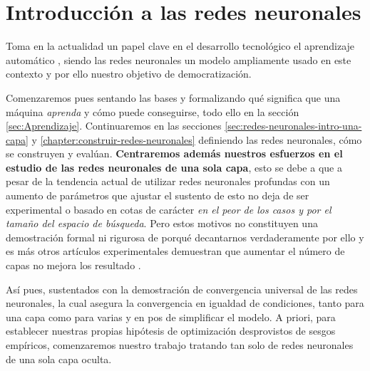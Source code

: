 
\chapter{Introducción a las redes neuronales} 
\label{chapter:Introduction-neuronal-networks}
Toma en la actualidad un papel clave en el desarrollo tecnológico el aprendizaje automático
\cite{importancia-arte-aprendizaje-automatico}, siendo 
las redes neuronales un modelo ampliamente usado en este contexto y por ello 
nuestro objetivo de democratización. 

Comenzaremos pues  sentando las bases y 
formalizando  
qué significa 
que una máquina \textit{aprenda}  y cómo puede conseguirse, 
todo ello en la sección \ref{sec:Aprendizaje}.
Continuaremos en las secciones \ref{sec:redes-neuronales-intro-una-capa} 
y \ref{chapter:construir-redes-neuronales}
definiendo las redes neuronales, cómo se construyen y evalúan. 
\label{motivo-una-capa}
\textbf{Centraremos además nuestros esfuerzos en el estudio de las redes neuronales de una sola capa}, 
esto se debe a que a pesar de la tendencia actual de utilizar redes neuronales profundas con 
un aumento de parámetros que ajustar 
\cite{a-universal-law-of-Robustness} \cite{CHAI2021100134} el sustento de esto no deja de ser experimental 
o basado en cotas de carácter \textit{en el peor de los casos y por el tamaño del espacio de búsqueda}.
Pero estos motivos no constituyen una demostración formal ni rigurosa de porqué decantarnos verdaderamente por 
ello y es más otros artículos experimentales demuestran que aumentar el número de capas no mejora los resultado 
\cite{DBLP:conf/iwann/Linan-Villafranca21}. 

Así pues, sustentados con la demostración de convergencia universal \cite{HORNIK1989359}
de las redes neuronales, la cual asegura la convergencia en igualdad de condiciones, 
tanto para una capa como para varias
y en pos de simplificar el modelo. 
A priori, 
para establecer nuestras propias hipótesis de optimización desprovistos
de sesgos empíricos, comenzaremos nuestro trabajo tratando tan solo de redes neuronales de una sola capa oculta.